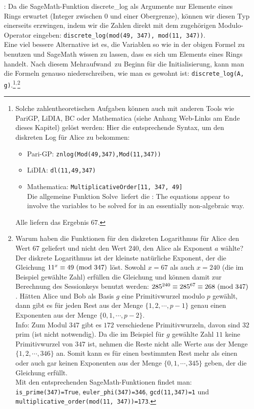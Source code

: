 \begin{refsegment}
\begin{remark}{:}
 Da die SageMath-Funktion discrete\_log als Argumente nur
Elemente eines Rings erwartet (Integer zwischen 0 und einer Obergrenze),
können wir diesen Typ einerseits erzwingen, indem wir die Zahlen direkt mit dem
zugehörigen Modulo-Operator eingeben: \texttt{discrete\_log(mod(49, 347), mod(11, 347))}.\\
Eine viel bessere Alternative ist es, die Variablen so wie in der obigen Formel
zu benutzen und SageMath wissen zu lassen, dass es sich um Elements eines Rings handelt.
Nach diesem \glqq Mehraufwand\grqq~zu Beginn für die Initialisierung, kann man die Formeln
genauso niederschreiben, wie man es gewohnt ist: \texttt{discrete\_log(A, g)}.\footnote{%
Solche zahlentheoretischen Aufgaben können auch mit anderen Tools wie PariGP,
LiDIA, BC oder Mathematica
(siehe Anhang Web-Links am Ende dieses Kapitel) gelöst werden:
Hier die entsprechende Syntax, um den diskreten Log für Alice zu bekommen:
	\begin{itemize}[nosep,label=-]
	\item Pari-GP: \texttt{znlog(Mod(49,347),Mod(11,347))}
	\item LiDIA:   \texttt{dl(11,49,347)}
	\item Mathematica: {\tt MultiplicativeOrder[11, 347, 49]}\\
		Die allgemeine Funktion \glqq Solve\grqq~liefert die  \grqq:
		The equations appear to involve the variables to be solved
		for in an essentially non-algebraic way.
	\end{itemize}
Alle liefern das Ergebnis $67$.
}${}^,$\footnote{%
Warum haben die Funktionen für den diskreten
Logarithmus für Alice
den Wert $67$ geliefert und nicht den Wert 240, den Alice als Exponent $a$ wählte?\\
Der diskrete Logarithmus ist der kleinste natürliche Exponent, der die
Gleichung $11^x \equiv 49{\rm ~(mod~}347)$ löst. Sowohl $x=67$ als auch $x=240$ (die im Beispiel
gewählte Zahl) erfüllen die Gleichung und können damit zur Berechnung des
Sessionkeys benutzt werden: $285^{240}  \equiv 285^{67} \equiv 268 {\rm ~(mod~}347)$.
Hätten Alice und Bob als Basis $g$ eine Primitivwurzel modulo $p$ gewählt,
dann gibt es für jeden Rest aus der Menge
$\{1, 2, \cdots, p-1\}$ genau einen Exponenten aus der Menge $\{0, 1, \cdots, p-2\}.$\\
Info: Zum Modul $347$ gibt es $172$ verschiedene Primitivwurzeln, davon sind $32$
prim (ist nicht notwendig).
Da die im Beispiel für $g$ gewählte Zahl $11$ keine Primitivwurzel
von $347$ ist, nehmen die Reste nicht alle Werte aus der Menge $\{1, 2, \cdots, 346\}$ an.
Somit kann es für einen bestimmten Rest mehr als einen oder auch gar keinen
Exponenten aus der Menge $\{0, 1, \cdots, 345\}$ geben, der die Gleichung
erfüllt.\\
Mit den entsprechenden SageMath-Funktionen findet man:\\
\texttt{is\_prime(347)=True}, \texttt{euler\_phi(347)=346}, \texttt{gcd(11,347)=1} und
\texttt{multiplicative\_order(mod(11, 347))=173}.

}
\end{remark}
\end{refsegment}
